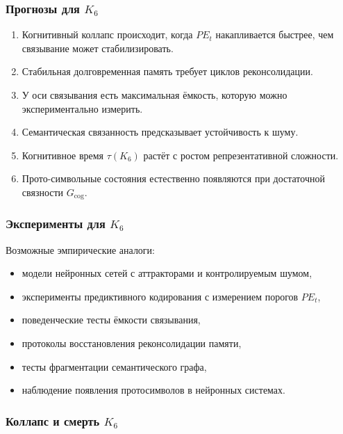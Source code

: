 \subsubsection{Прогнозы для \texorpdfstring{$K_6$}{K_6}}

\begin{enumerate}
    \item Когнитивный коллапс происходит, когда $PE_t$ накапливается быстрее,
          чем связывание может стабилизировать.
    \item Стабильная долговременная память требует циклов реконсолидации.
    \item У оси связывания есть максимальная ёмкость, которую можно
          экспериментально измерить.
    \item Семантическая связанность предсказывает устойчивость к шуму.
    \item Когнитивное время $\tau(K_6)$ растёт с ростом
          репрезентативной сложности.
    \item Прото-символьные состояния естественно появляются при достаточной
          связности $G_{\mathrm{cog}}$.
\end{enumerate}

\subsubsection{Эксперименты для \texorpdfstring{$K_6$}{K_6}}

Возможные эмпирические аналоги:
\begin{itemize}
    \item модели нейронных сетей с аттракторами и контролируемым шумом,
    \item эксперименты предиктивного кодирования с измерением порогов $PE_t$,
    \item поведенческие тесты ёмкости связывания,
    \item протоколы восстановления реконсолидации памяти,
    \item тесты фрагментации семантического графа,
    \item наблюдение появления протосимволов в нейронных системах.
\end{itemize}

\subsubsection{Коллапс и смерть \texorpdfstring{$K_6$}{K_6}}

